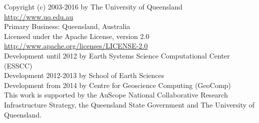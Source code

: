 
%
%
%

\begin{center}
Copyright (c) 2003-2016 by The University of Queensland\\
\url{http://www.uq.edu.au}\\
Primary Business: Queensland, Australia\\
Licensed under the Apache License, version 2.0\\
\url{http://www.apache.org/licenses/LICENSE-2.0}\\
Development until 2012 by Earth Systems Science Computational Center (ESSCC)\\
Development 2012-2013 by School of Earth Sciences\\
Development from 2014 by Centre for Geoscience Computing (GeoComp)\\

This work is supported by the AuScope National Collaborative Research
Infrastructure Strategy, the Queensland State Government and The University
of Queensland.
\end{center}

